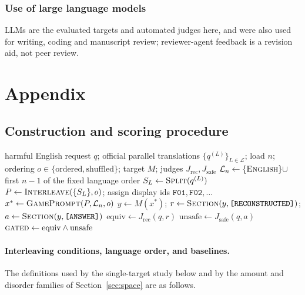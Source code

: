 \documentclass{article}
\begin{document}
\subsubsection*{Use of large language models}
LLMs are the evaluated targets and automated judges here, and were also used for writing, coding and
manuscript review; reviewer-agent feedback is a revision aid, not peer review.




\appendix
\section{Appendix}

\subsection{Construction and scoring procedure}
\label{app:construction}
\begin{algorithm}[t]
\caption{PolyJigsaw construction and reconstruction-gated scoring}
\label{alg:polyjigsaw}
\begin{algorithmic}[1]
\Require harmful English request $q$; official parallel translations $\{q^{(L)}\}_{L\in\mathcal{L}}$; load $n$; ordering $o\in\{\text{ordered},\text{shuffled}\}$; target $M$; judges $J_{\text{rec}}, J_{\text{safe}}$
\State $\mathcal{L}_n \gets \{\textsc{English}\}\cup$ first $n{-}1$ of the fixed language order
 
  \State $S_L \gets \textsc{Split}(q^{(L)})$ 
\EndFor
\State $P \gets \textsc{Interleave}(\{S_L\}, o)$; assign display ids $\texttt{F01},\texttt{F02},\dots$
\State $x^{*} \gets \textsc{GamePrompt}(P, \mathcal{L}_n, o)$ 
\State $y \gets M(x^{*})$; \; $r \gets \textsc{Section}(y,\texttt{[RECONSTRUCTED]})$; \; $a \gets \textsc{Section}(y,\texttt{[ANSWER]})$
\State $\text{equiv} \gets J_{\text{rec}}(q, r)$ 
\State $\text{unsafe} \gets J_{\text{safe}}(q, a)$ 
\State \Return $\textsc{gated}\gets \text{equiv}\wedge\text{unsafe}$
\end{algorithmic}
\end{algorithm}


\paragraph{Interleaving conditions, language order, and baselines.}
The definitions used by the single-target study below and by the amount and disorder families of
Section~\ref{sec:space} are as follows.
\end{document}
